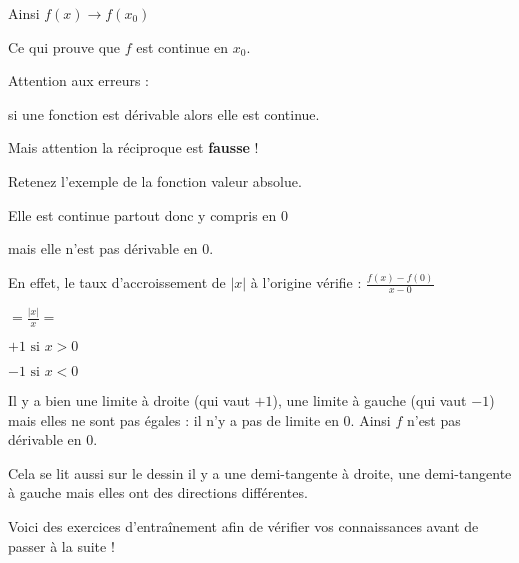Ainsi $f(x) \to f(x_0)$

\change

Ce qui prouve que $f$ est continue en $x_0$.


\diapo

Attention aux erreurs : 

si une fonction est dérivable alors elle est continue. 

Mais attention la réciproque est \textbf{fausse} !


\change

Retenez l'exemple de la fonction valeur absolue.

\change

Elle est continue partout donc y compris en $0$

mais elle n'est pas dérivable en $0$.




\change

En effet, le taux d'accroissement de $|x|$ à l'origine vérifie :
$\frac{f(x)-f(0)}{x-0}$

\change

$ = \frac{|x|}{x}=$

\change

$+1  \text{ si } x>0 $

\change

$-1  \text{ si } x < 0$


Il y a bien une limite à droite (qui vaut $+1$), une limite à gauche (qui vaut $-1$) mais elles ne sont pas égales :
il n'y a pas de limite en $0$. Ainsi $f$ n'est pas dérivable en $0$.


Cela se lit aussi sur le dessin il y a une demi-tangente à droite, une demi-tangente à gauche
mais elles ont des directions différentes.



\diapo

Voici des exercices d'entraînement afin de vérifier vos connaissances 
avant de passer à la suite !




